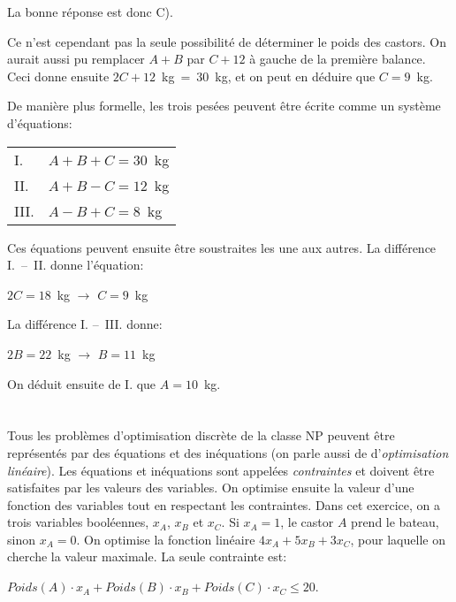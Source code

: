 {{La bonne réponse est donc C).

Ce n’est cependant pas la seule possibilité de déterminer le poids des castors. On aurait aussi pu remplacer ${A + B}$ par ${C + 12}$ à gauche de la première balance. Ceci donne ensuite ${2C + 12}$~kg~=~$30$~kg, et on peut en déduire que ${C = 9}$~kg.

De manière plus formelle, les trois pesées peuvent être écrite comme un système d’équations:

\begin{tabular}{ @{} l l @{} }
  I. & ${A + B + C = 30}$~kg \\ 
  II. & ${A + B - C = 12}$~kg \\ 
  III. & ${A - B + C = 8}$~kg
\end{tabular}

Ces équations peuvent ensuite être soustraites les une aux autres. La différence I.~–~II. donne l’équation:

\begin{adjustwidth}{1.5em}{0em}
${2C = 18}$~kg \ensuremath{\rightarrow} ${C = 9}$~kg
\end{adjustwidth}

La différence I. –~III. donne:

\begin{adjustwidth}{1.5em}{0em}
${2B = 22}$~kg \ensuremath{\rightarrow} ${B = 11}$~kg
\end{adjustwidth}

On déduit ensuite de I. que ${A = 10}$~kg.



\section*{\BrochureItsInformatics}
Tous les problèmes d’optimisation discrète de la classe NP peuvent être représentés par des équations et des inéquations (on parle aussi de d’\emph{optimisation linéaire}). Les équations et inéquations sont appelées \emph{contraintes} et doivent être satisfaites par les valeurs des variables. On optimise ensuite la valeur d’une fonction des variables tout en respectant les contraintes. Dans cet exercice, on a trois variables booléennes, ${x_A}$, ${x_B}$ et ${x_C}$. Si ${x_A = 1}$, le castor ${A}$ prend le bateau, sinon ${x_A = 0}$. On optimise la fonction linéaire ${4x_A + 5x_B + 3x_C}$, pour laquelle on cherche la valeur maximale. La seule contrainte est:

\begin{adjustwidth}{1.5em}{0em}
${Poids(A) \cdot x_A + Poids(B) \cdot x_B + Poids(C) \cdot x_C \leq 20}$.
\end{adjustwidth}

}}
